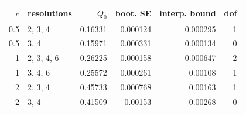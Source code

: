 \begin{tabular}{rlrrrr}
\toprule
$c$ & resolutions & $Q_0$ & boot. SE & interp. bound & dof\\\midrule
0.5 & 2, 3, 4 & 0.16331 & 0.000124 & 0.000295 & 1\\
0.5 & 3, 4 & 0.15971 & 0.000331 & 0.000134 & 0\\
1 & 2, 3, 4, 6 & 0.26225 & 0.000158 & 0.000647 & 2\\
1 & 3, 4, 6 & 0.25572 & 0.000261 & 0.00108 & 1\\
2 & 2, 3, 4 & 0.45733 & 0.000768 & 0.00163 & 1\\
2 & 3, 4 & 0.41509 & 0.00153 & 0.00268 & 0\\
\bottomrule
\end{tabular}
